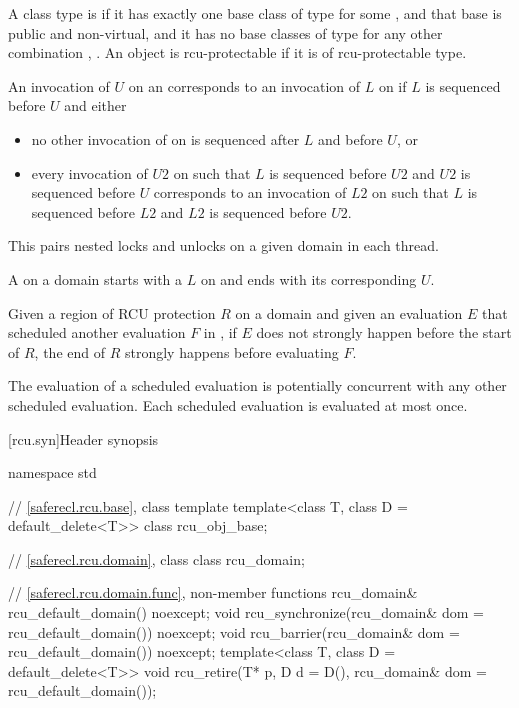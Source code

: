 \pnum
A class type  is 
if it has exactly one base class of type 
for some , and that base is public and non-virtual, and
it has no base classes of type 
for any other combination , .
An object is rcu-protectable if it is of rcu-protectable type.

\pnum
An invocation of  $U$ on an 
corresponds to an invocation of  $L$ on 
if $L$ is sequenced before $U$ and either
\begin{itemize}
\item
no other invocation of  on 
is sequenced after $L$ and before $U$, or
\item
every invocation of  $U2$ on 
such that $L$ is sequenced before $U2$ and $U2$ is sequenced before $U$
corresponds to an invocation of  $L2$ on 
such that $L$ is sequenced before $L2$ and $L2$ is sequenced before $U2$.
\end{itemize}
\begin{note}
This pairs nested locks and unlocks on a given domain in each thread.
\end{note}

\pnum
A  on a domain 
starts with a  $L$ on  and
ends with its corresponding  $U$.

\pnum
Given a region of RCU protection $R$ on a domain  and
given an evaluation $E$ that scheduled another evaluation $F$ in ,
if $E$ does not strongly happen before the start of $R$,
the end of $R$ strongly happens before evaluating $F$.

\pnum
The evaluation of a scheduled evaluation is potentially concurrent with
any other scheduled evaluation.
Each scheduled evaluation is evaluated at most once.

[rcu.syn]{Header  synopsis}

\begin{codeblock}
namespace std {
  // \ref{saferecl.rcu.base}, class template 
  template<class T, class D = default_delete<T>> class rcu_obj_base;

  // \ref{saferecl.rcu.domain}, class 
  class rcu_domain;

  // \ref{saferecl.rcu.domain.func}, non-member functions
  rcu_domain& rcu_default_domain() noexcept;
  void rcu_synchronize(rcu_domain& dom = rcu_default_domain()) noexcept;
  void rcu_barrier(rcu_domain& dom = rcu_default_domain()) noexcept;
  template<class T, class D = default_delete<T>>
    void rcu_retire(T* p, D d = D(), rcu_domain& dom = rcu_default_domain());
}
\end{codeblock}

